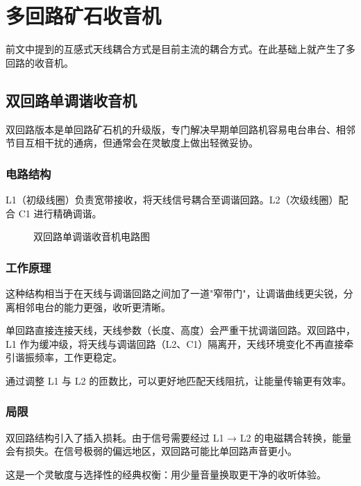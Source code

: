 \documentclass[12pt,UTF8]{ctexbook}
\begin{document}
\chapter{多回路矿石收音机}
\label{chap:multi-loop-radio}

前文中提到的互感式天线耦合方式是目前主流的耦合方式。在此基础上就产生了多回路的收音机。

\section{双回路单调谐收音机}

双回路版本是单回路矿石机的升级版，专门解决早期单回路机容易电台串台、相邻节目互相干扰的通病，但通常会在灵敏度上做出轻微妥协。

\subsection{电路结构}

L1（初级线圈）负责宽带接收，将天线信号耦合至调谐回路。L2（次级线圈）配合 C1 进行精确调谐。

\begin{figure}[H]
	\centering
	\caption{双回路单调谐收音机电路图}
	\label{fig:double-loop-circuit}
\end{figure}

\subsection{工作原理}

这种结构相当于在天线与调谐回路之间加了一道"窄带门"，让调谐曲线更尖锐，分离相邻电台的能力更强，收听更清晰。

单回路直接连接天线，天线参数（长度、高度）会严重干扰调谐回路。双回路中，L1 作为缓冲级，将天线与调谐回路（L2、C1）隔离开，天线环境变化不再直接牵引谐振频率，工作更稳定。

通过调整 L1 与 L2 的匝数比，可以更好地匹配天线阻抗，让能量传输更有效率。

\subsection{局限}

双回路结构引入了插入损耗。由于信号需要经过 L1 → L2 的电磁耦合转换，能量会有损失。在信号极弱的偏远地区，双回路可能比单回路声音更小。

这是一个灵敏度与选择性的经典权衡：用少量音量换取更干净的收听体验。
\end{document}
